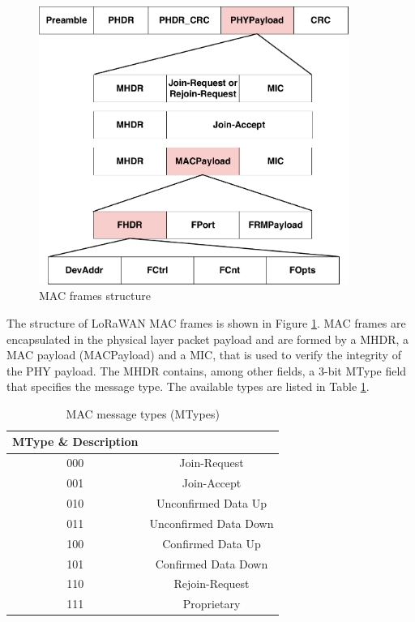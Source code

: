 \begin{figure}[h]
    \centering
    \includegraphics[width=0.9\textwidth]{images/mac-commands.pdf}
    \caption{MAC frames structure}
    \label{fig:lorawan-mac}
\end{figure}

The structure of LoRaWAN MAC frames is shown in Figure \ref{fig:lorawan-mac}.
MAC frames are encapsulated in the physical layer packet payload and are formed by a \gls{MHDR}, a MAC payload (MACPayload) and a \gls{MIC}, that is used to verify the integrity of the PHY payload. 
The \gls{MHDR} contains, among other fields, a 3-bit MType field that specifies the message type. The available types are listed in Table \ref{tab:mtypes}.

\begin{table}[]
\centering

\begin{tabular}{|c|c|}
\hline
\textbf{MType} \& \textbf{Description}\\ \hline
 000 & Join-Request  \\ \hline
 001 & Join-Accept \\ \hline
 010 & Unconfirmed Data Up  \\ \hline
 011 & Unconfirmed Data Down  \\ \hline
 100 & Confirmed Data Up \\ \hline 
 101 & Confirmed Data Down \\ \hline
 110 & Rejoin-Request \\ \hline  
 111 & Proprietary \\ \hline 
\end{tabular}
\caption{MAC message types (MTypes)}
\label{tab:mtypes}

\end{table}


